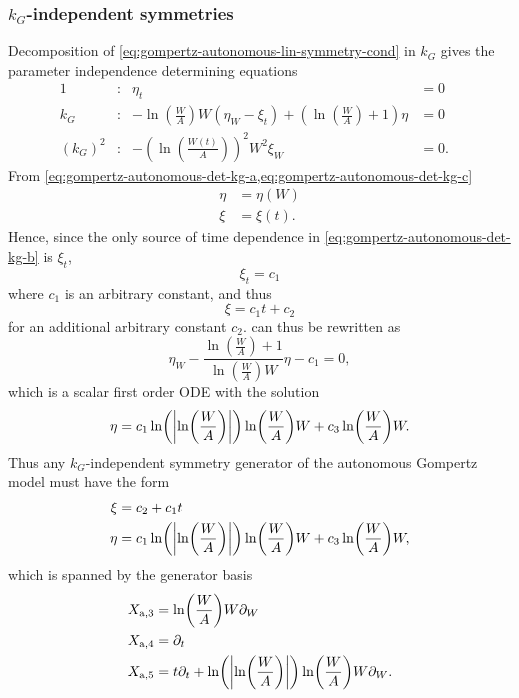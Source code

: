 \subsubsection{\texorpdfstring{\(k_G\)-independent symmetries}{Growth rate-independent symmetries}}

Decomposition of \cref{eq:gompertz-autonomous-lin-symmetry-cond} in \(k_G\) gives the parameter independence determining equations
\begin{subequations}
  \begin{flalign}
    1 & : & \eta_t &= 0 &\label{eq:gompertz-autonomous-det-kg-a}\\
    k_G & : & -\ln\left(\frac{W}{A}\right) W\left(\eta_W - \xi_t\right) + \left(\ln\left(\frac{W}{A}\right) + 1\right) \eta &= 0 &\label{eq:gompertz-autonomous-det-kg-b}\\
    (k_G)^2 & : & -\left(\ln\left(\frac{W(t)}{A}\right)\right)^2 W^2 \xi_W &= 0. &\label{eq:gompertz-autonomous-det-kg-c}
  \end{flalign}
\end{subequations}
From \cref{eq:gompertz-autonomous-det-kg-a,eq:gompertz-autonomous-det-kg-c}
\begin{align*}
  \eta &= \eta(W) \\
  \xi &= \xi(t).
\end{align*}
Hence, since the only source of time dependence in \cref{eq:gompertz-autonomous-det-kg-b} is \(\xi_t\),
\begin{equation*}
  \xi_t = c_1
\end{equation*}
where \(c_1\) is an arbitrary constant, and thus
\begin{equation*}
  \xi = c_1 t + c_2
\end{equation*}
for an additional arbitrary constant \(c_2\).
 can thus be rewritten as
\begin{equation*}
  \eta_W - \frac{\ln\left(\frac{W}{A}\right) + 1}{\ln\left(\frac{W}{A}\right) W} \eta - c_1 = 0,
\end{equation*}
which is a scalar first order ODE with the solution
\begin{equation*}
  \eta = c_1 \ln\left(\abs{\ln\left(\frac{W}{A}\right)}\right) \ln\left(\frac{W}{A}\right) W + c_3 \ln\left(\frac{W}{A}\right) W.
\end{equation*}
Thus any \(k_G\)-independent symmetry generator of the autonomous Gompertz model  must have the form
\begin{align*}
  \xi &= c_2 + c_1 t \\
  \eta &= c_1 \ln\left(\abs{\ln\left(\frac{W}{A}\right)}\right) \ln\left(\frac{W}{A}\right) W + c_3 \ln\left(\frac{W}{A}\right) W,
\end{align*}
which is spanned by the generator basis
\begin{align*}
  X_{\text{a},3} &= \ln\left(\frac{W}{A}\right) W \partial_W \\
  X_{\text{a},4} &= \partial_t \\
  X_{\text{a},5} &= t \partial_t + \ln\left(\abs{\ln\left(\frac{W}{A}\right)}\right) \ln\left(\frac{W}{A}\right) W \partial_W.
\end{align*}

